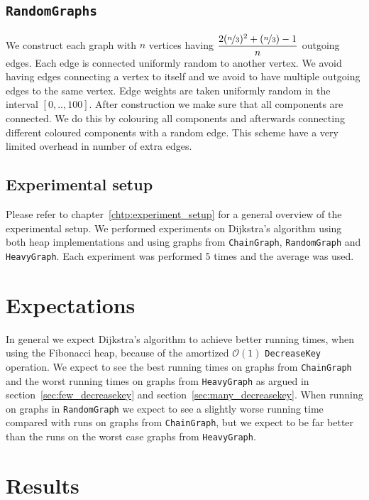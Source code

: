 \documentclass[a4paper,oneside,article,11pt]{memoir}
\begin{document}
\subsection{\texttt{RandomGraphs}}
We construct each graph with $n$ vertices having $\dfrac{2(\nicefrac{n}{3})^2 + (\nicefrac{n}{3})-1}{n}$ outgoing edges. Each edge is connected uniformly random to another vertex. We avoid having edges connecting a vertex to itself and we avoid to have multiple outgoing edges to the same vertex. Edge weights are taken uniformly random in the interval $[0, .., 100]$. After construction we make sure that all components are connected. We do this by colouring all components and afterwards connecting different coloured components with a random edge. This scheme have a very limited overhead in number of extra edges.

\subsection{Experimental setup}
Please refer to chapter~\ref{chtp:experiment_setup} for a general overview of the experimental setup. We performed experiments on Dijkstra's algorithm using both heap implementations and using graphs from \texttt{ChainGraph}, \texttt{RandomGraph} and \texttt{HeavyGraph}. Each experiment was performed 5 times and the average was used.

\section{Expectations}
In general we expect Dijkstra's algorithm to achieve better running times, when using the Fibonacci heap, because of the amortized $\mathcal{O}(1)$ \texttt{DecreaseKey} operation. We expect to see the best running times on graphs from \texttt{ChainGraph} and the worst running times on graphs from \texttt{HeavyGraph} as argued in section~\ref{sec:few_decreasekey} and section~\ref{sec:many_decreasekey}. When running on graphs in \texttt{RandomGraph} we expect to see a slightly worse running time compared with runs on graphs from \texttt{ChainGraph}, but we expect to be far better than the runs on the worst case graphs from \texttt{HeavyGraph}.

\section{Results}
\end{document}
